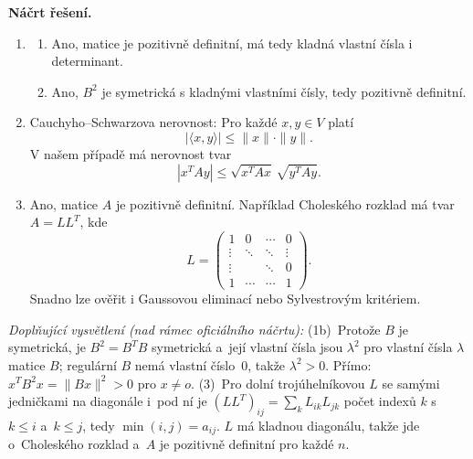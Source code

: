 \medskip
\noindent\textbf{Náčrt řešení.}\par
\begin{enumerate}
  \item
    \begin{enumerate}
      \item[(a)] Ano, matice je pozitivně definitní, má tedy kladná vlastní čísla i determinant.
      \item[(b)] Ano, $B^2$ je symetrická s kladnými vlastními čísly, tedy pozitivně definitní.
    \end{enumerate}
  \item Cauchyho--Schwarzova nerovnost: Pro každé $x, y \in V$ platí
    \[
      |\langle x, y \rangle| \le \|x\| \cdot \|y\|.
    \]
    V našem případě má nerovnost tvar
    \[
      |x^T A y| \le \sqrt{x^T A x}\, \sqrt{y^T A y}.
    \]
  \item Ano, matice $A$ je pozitivně definitní. Například Choleského rozklad má tvar $A = LL^T$, kde
    \[
      L = \begin{pmatrix}
        1 & 0 & \cdots & 0 \\
        \vdots & \ddots & \ddots & \vdots \\
        \vdots & & \ddots & 0 \\
        1 & \cdots & \cdots & 1
      \end{pmatrix}.
    \]
    Snadno lze ověřit i Gaussovou eliminací nebo Sylvestrovým kritériem.
\end{enumerate}

\medskip
\noindent\textit{Doplňující vysvětlení (nad rámec oficiálního náčrtu):} (1b)~Protože $B$ je symetrická, je $B^2=B^TB$ symetrická a~její vlastní čísla jsou $\lambda^2$ pro vlastní čísla $\lambda$ matice $B$; regulární $B$ nemá vlastní číslo~$0$, takže $\lambda^2>0$. Přímo: $x^TB^2x=\|Bx\|^2>0$ pro $x\neq o$. (3)~Pro dolní trojúhelníkovou $L$ se samými jedničkami na diagonále i~pod ní je $(LL^T)_{ij}=\sum_k L_{ik}L_{jk}$ počet indexů $k$ s~$k\le i$ a~$k\le j$, tedy $\min(i,j)=a_{ij}$. $L$ má kladnou diagonálu, takže jde o~Choleského rozklad a~$A$ je pozitivně definitní pro každé $n$.

